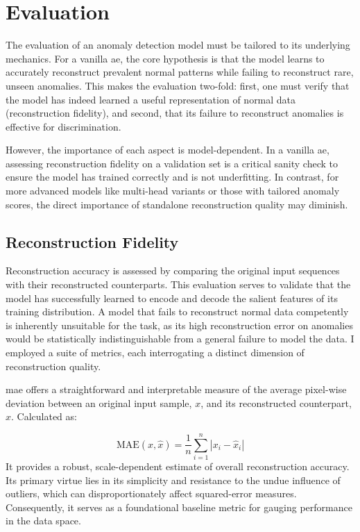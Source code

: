 \section{Evaluation}
\label{sec:eval}
The evaluation of an anomaly detection model must be tailored to its underlying mechanics. 
For a vanilla \gls{ae}, the core hypothesis is that the model learns to accurately reconstruct prevalent normal patterns while failing to reconstruct rare, unseen anomalies. 
This makes the evaluation two-fold: first, one must verify that the model has indeed learned a useful representation of normal data (reconstruction fidelity), and second, that its failure to reconstruct anomalies is effective for discrimination.

However, the importance of each aspect is model-dependent. 
In a vanilla \gls{ae}, assessing reconstruction fidelity on a validation set is a critical sanity check to ensure the model has trained correctly and is not underfitting. 
In contrast, for more advanced models like multi-head variants or those with tailored anomaly scores, the direct importance of standalone reconstruction quality may diminish. 


\subsection{Reconstruction Fidelity}
\label{subsec:reconstruction-eval}
Reconstruction accuracy is assessed by comparing the original input sequences with their reconstructed counterparts. 
This evaluation serves to validate that the model has successfully learned to encode and decode the salient features of its training distribution. 
A model that fails to reconstruct normal data competently is inherently unsuitable for the task, as its high reconstruction error on anomalies would be statistically indistinguishable from a general failure to model the data. 
I employed a suite of metrics, each interrogating a distinct dimension of reconstruction quality.

\gls{mae} offers a straightforward and interpretable measure of the average pixel-wise deviation between an original input sample, $x$, and its reconstructed counterpart, $\hat{x}$. Calculated as:

\begin{equation}
    \text{MAE}(x, \hat{x}) = \frac{1}{n} \sum_{i=1}^{n} |x_i - \hat{x}_i|
\end{equation}
It provides a robust, scale-dependent estimate of overall reconstruction accuracy. 
Its primary virtue lies in its simplicity and resistance to the undue influence of outliers, which can disproportionately affect squared-error measures. 
Consequently, it serves as a foundational baseline metric for gauging performance in the data space.

